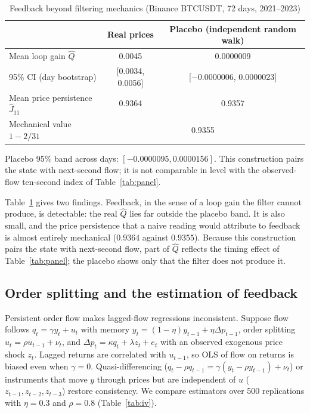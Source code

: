\documentclass[12pt]{article}
\theoremstyle{definition}
\theoremstyle{remark}
\begin{document}
\begin{table}[t]\centering
\begin{threeparttable}
\caption{Feedback beyond filtering mechanics (Binance BTCUSDT, 72 days, 2021--2023)}\label{tab:feedback}
\begin{tabular}{lcc}
\toprule
 & Real prices & Placebo (independent random walk)\\
\midrule
Mean loop gain $\hat Q$ & 0.0045 & 0.0000009\\
95\% CI (day bootstrap) & [0.0034, 0.0056] & [$-$0.0000006, 0.0000023]\\
Mean price persistence $\hat J_{11}$ & 0.9364 & 0.9357\\
Mechanical value $1-2/31$ & \multicolumn{2}{c}{0.9355}\\
\bottomrule
\end{tabular}
\begin{tablenotes}\footnotesize\item Placebo 95\% band across days: $[-0.0000095,0.0000156]$. This construction pairs the state with next-second flow; it is not comparable in level with the observed-flow ten-second index of Table~\ref{tab:panel}.\end{tablenotes}
\end{threeparttable}
\end{table}

Table~\ref{tab:feedback} gives two findings. Feedback, in the sense of a loop gain the filter cannot produce, is detectable: the real $\hat Q$ lies far outside the placebo band. It is also small, and the price persistence that a naive reading would attribute to feedback is almost entirely mechanical ($0.9364$ against $0.9355$). Because this construction pairs the state with next-second flow, part of $\hat Q$ reflects the timing effect of Table~\ref{tab:panel}; the placebo shows only that the filter does not produce it.

\subsection{Order splitting and the estimation of feedback}

Persistent order flow makes lagged-flow regressions inconsistent. Suppose flow follows $q_t=\gamma y_t+u_t$ with memory $y_t=(1-\eta)y_{t-1}+\eta\Delta p_{t-1}$, order splitting $u_t=\rho u_{t-1}+\nu_t$, and $\Delta p_t=\kappa q_t+\lambda z_t+e_t$ with an observed exogenous price shock $z_t$. Lagged returns are correlated with $u_{t-1}$, so OLS of flow on returns is biased even when $\gamma=0$. Quasi-differencing ($q_t-\rho q_{t-1}=\gamma(y_t-\rho y_{t-1})+\nu_t$) or instruments that move $y$ through prices but are independent of $u$ ($z_{t-1},z_{t-2},z_{t-3}$) restore consistency. We compare estimators over 500 replications with $\eta=0.3$ and $\rho=0.8$ (Table~\ref{tab:iv}).
\end{document}
